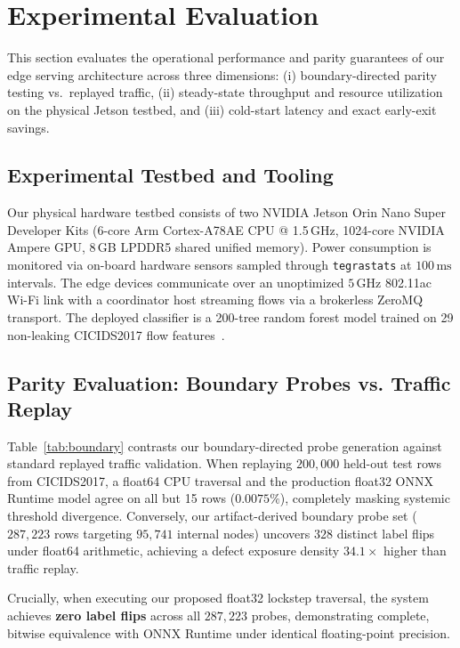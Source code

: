 \section{Experimental Evaluation}
\label{sec:evaluation}

This section evaluates the operational performance and parity guarantees of our edge serving architecture across three dimensions: (i) boundary-directed parity testing vs.\ replayed traffic, (ii) steady-state throughput and resource utilization on the physical Jetson testbed, and (iii) cold-start latency and exact early-exit savings.

\subsection{Experimental Testbed and Tooling}

Our physical hardware testbed consists of two NVIDIA Jetson Orin Nano Super Developer Kits (6-core Arm Cortex-A78AE CPU @ 1.5\,GHz, 1024-core NVIDIA Ampere GPU, 8\,GB LPDDR5 shared unified memory). Power consumption is monitored via on-board hardware sensors sampled through \texttt{tegrastats} at $100\,\text{ms}$ intervals. The edge devices communicate over an unoptimized $5\,\text{GHz}$ 802.11ac Wi-Fi link with a coordinator host streaming flows via a brokerless ZeroMQ transport. The deployed classifier is a 200-tree random forest model trained on 29 non-leaking CICIDS2017 flow features~\cite{sharafaldin2018toward}.

\subsection{Parity Evaluation: Boundary Probes vs. Traffic Replay}

Table~\ref{tab:boundary} contrasts our boundary-directed probe generation against standard replayed traffic validation. When replaying $200{,}000$ held-out test rows from CICIDS2017, a float64 CPU traversal and the production float32 ONNX Runtime model agree on all but 15 rows ($0.0075\%$), completely masking systemic threshold divergence. Conversely, our artifact-derived boundary probe set ($287{,}223$ rows targeting $95{,}741$ internal nodes) uncovers $328$ distinct label flips under float64 arithmetic, achieving a defect exposure density $34.1\times$ higher than traffic replay.

Crucially, when executing our proposed float32 lockstep traversal, the system achieves \textbf{zero label flips} across all $287{,}223$ probes, demonstrating complete, bitwise equivalence with ONNX Runtime under identical floating-point precision.

